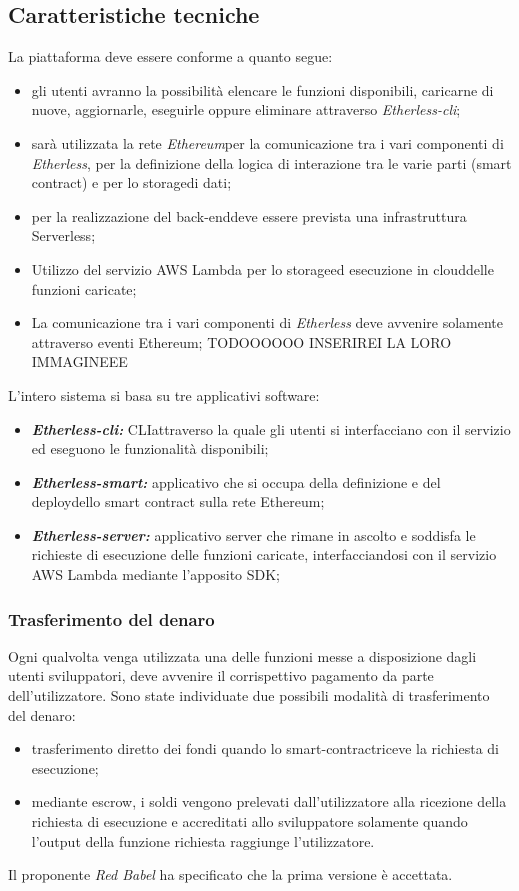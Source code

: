 \subsection{Caratteristiche tecniche}
La piattaforma deve essere conforme a quanto segue:
\begin{itemize}
	\item gli utenti avranno la possibilità elencare le funzioni disponibili,  caricarne di nuove, aggiornarle, eseguirle oppure eliminare attraverso \textit{Etherless-cli};
	\item sarà utilizzata la rete \textit{Ethereum}\glo per la comunicazione tra i vari componenti di \textit{Etherless}, per la definizione della logica di interazione tra le varie parti (smart contract\glos) e per lo storage\glo di dati;
	\item per la realizzazione del back-end\glo deve essere prevista una infrastruttura Serverless\glo;
	\item Utilizzo del servizio AWS Lambda per lo storage\glo ed esecuzione in cloud\glo delle funzioni caricate;
	\item La comunicazione tra i vari componenti di \textit{Etherless} deve avvenire solamente attraverso eventi Ethereum\glo; TODOOOOOO INSERIREI LA LORO IMMAGINEEE

\end{itemize}
L'intero sistema si basa su tre applicativi software:
	\begin{itemize}
		\item \textbf{\textit{Etherless-cli:}} CLI\glo attraverso la quale gli utenti si interfacciano con il servizio ed eseguono le funzionalità disponibili;
		\item \textbf{\textit{Etherless-smart:}} applicativo che si occupa della definizione e del deploy\glo dello smart contract sulla rete Ethereum\glos;
		\item \textbf{\textit{Etherless-server:}} applicativo server che rimane in ascolto e soddisfa le richieste di esecuzione delle funzioni caricate, interfacciandosi con il servizio AWS Lambda mediante l'apposito SDK\glos;
	\end{itemize}
\subsubsection{Trasferimento del denaro}
Ogni qualvolta venga utilizzata una delle funzioni messe a disposizione dagli utenti sviluppatori, deve avvenire il corrispettivo pagamento da parte dell'utilizzatore. Sono state individuate due possibili modalità di trasferimento del denaro:
\begin{itemize}
	\item trasferimento diretto dei fondi quando lo smart-contract\glo riceve la richiesta di esecuzione;
	\item mediante escrow\glos, i soldi vengono prelevati dall'utilizzatore alla ricezione della richiesta di esecuzione e accreditati allo sviluppatore solamente quando l'output della funzione richiesta raggiunge l'utilizzatore.
\end{itemize}
Il proponente \textit{Red Babel} ha specificato che la prima versione è accettata.


